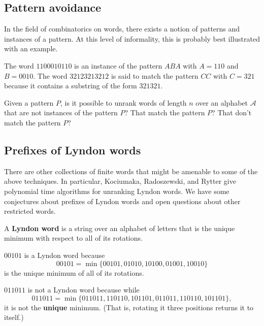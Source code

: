 \subsection{Pattern avoidance}
In the field of combinatorics on words, there exists a notion of patterns and
instances of a pattern. At this level of informality, this is probably best
illustrated with an example.

\begin{example}
  The word $1100010110$ is an instance of the pattern $ABA$ with $A = 110$ and
  $B = 0010$.
  The word $32123213212$ is said to match the pattern $CC$ with $C = 321$ because
  it contains a substring of the form $321321$.
\end{example}

\begin{openquestion}
  Given a pattern $P$, is it possible to unrank words of length $n$ over an
  alphabet $\mathcal A$ that are not instances of the pattern $P$?
  That match the pattern $P$? That don't match the pattern $P$?
\end{openquestion}

\subsection{Prefixes of Lyndon words}
There are other collections of finite words that might be amenable to some of
the above techniques. In particular, Kociumaka, Radoszewski, and Rytter
\cite{Kociumaka2014} give polynomial time algorithms for unranking Lyndon
words. We have some conjectures about prefixes of Lyndon words and open
questions about other restricted words.
\begin{definition}
  A \textbf{Lyndon word} is a string over an alphabet of letters
  that is the unique minimum with respect to all of its rotations.
\end{definition}
\begin{example}
  $00101$ is a Lyndon word because \begin{equation}
    00101 = \min\{00101, 01010, 10100, 01001, 10010\}
  \end{equation} is the unique minimum of all of its rotations.

  $011011$ is not a Lyndon word because while \begin{equation}
    011011 = \min\{011011, 110110, 101101, 011011, 110110, 101101\},
  \end{equation}
  it is not the \textbf{unique} minimum.
  (That is, rotating it three positions returns it to itself.)
\end{example}

